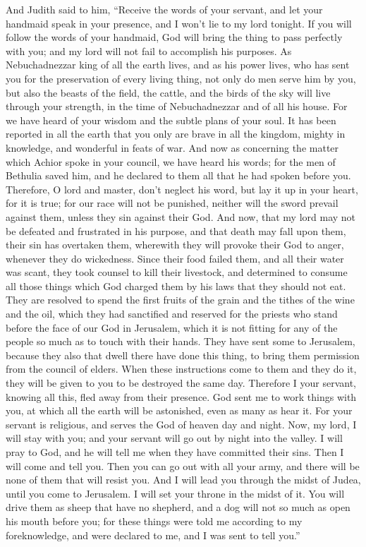  And Judith said to him, ``Receive the words of your
servant, and let your handmaid speak in your presence, and I won't lie
to my lord tonight.  If you will follow the words of your
handmaid, God will bring the thing to pass perfectly with you; and my
lord will not fail to accomplish his purposes.  As
Nebuchadnezzar king of all the earth lives, and as his power lives, who
has sent you for the preservation of every living thing, not only do men
serve him by you, but also the beasts of the field, the cattle, and the
birds of the sky will live through your strength, in the time of
Nebuchadnezzar and of all his house.  For we have heard of
your wisdom and the subtle plans of your soul. It has been reported in
all the earth that you only are brave in all the kingdom, mighty in
knowledge, and wonderful in feats of war.  And now as
concerning the matter which Achior spoke in your council, we have heard
his words; for the men of Bethulia saved him, and he declared to them
all that he had spoken before you.  Therefore, O lord and
master, don't neglect his word, but lay it up in your heart, for it is
true; for our race will not be punished, neither will the sword prevail
against them, unless they sin against their God.  And now,
that my lord may not be defeated and frustrated in his purpose, and that
death may fall upon them, their sin has overtaken them, wherewith they
will provoke their God to anger, whenever they do wickedness.
 Since their food failed them, and all their water was
scant, they took counsel to kill their livestock, and determined to
consume all those things which God charged them by his laws that they
should not eat.  They are resolved to spend the first
fruits of the grain and the tithes of the wine and the oil, which they
had sanctified and reserved for the priests who stand before the face of
our God in Jerusalem, which it is not fitting for any of the people so
much as to touch with their hands.  They have sent some to
Jerusalem, because they also that dwell there have done this thing, to
bring them permission from the council of elders.  When
these instructions come to them and they do it, they will be given to
you to be destroyed the same day.  Therefore I your
servant, knowing all this, fled away from their presence. God sent me to
work things with you, at which all the earth will be astonished, even as
many as hear it.  For your servant is religious, and serves
the God of heaven day and night. Now, my lord, I will stay with you; and
your servant will go out by night into the valley. I will pray to God,
and he will tell me when they have committed their sins. 
Then I will come and tell you. Then you can go out with all your army,
and there will be none of them that will resist you.  And I
will lead you through the midst of Judea, until you come to Jerusalem. I
will set your throne in the midst of it. You will drive them as sheep
that have no shepherd, and a dog will not so much as open his mouth
before you; for these things were told me according to my foreknowledge,
and were declared to me, and I was sent to tell you.''

